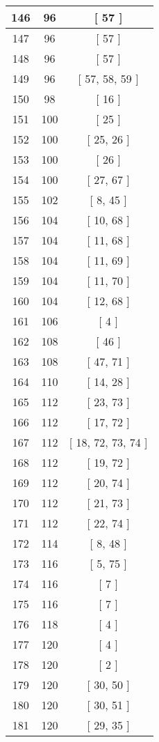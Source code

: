 \begin{center}
\begin{longtable}[H]{|| c c c ||}
\hline
146 & 96 & [ 57 ] \\ 
\hline
147 & 96 & [ 57 ] \\ 
\hline
148 & 96 & [ 57 ] \\ 
\hline
149 & 96 & [ 57, 58, 59 ] \\ 
\hline
150 & 98 & [ 16 ] \\ 
\hline
151 & 100 & [ 25 ] \\ 
\hline
152 & 100 & [ 25, 26 ] \\ 
\hline
153 & 100 & [ 26 ] \\ 
\hline
154 & 100 & [ 27, 67 ] \\ 
\hline
155 & 102 & [ 8, 45 ] \\ 
\hline
156 & 104 & [ 10, 68 ] \\ 
\hline
157 & 104 & [ 11, 68 ] \\ 
\hline
158 & 104 & [ 11, 69 ] \\ 
\hline
159 & 104 & [ 11, 70 ] \\ 
\hline
160 & 104 & [ 12, 68 ] \\ 
\hline
161 & 106 & [ 4 ] \\ 
\hline
162 & 108 & [ 46 ] \\ 
\hline
163 & 108 & [ 47, 71 ] \\ 
\hline
164 & 110 & [ 14, 28 ] \\ 
\hline
165 & 112 & [ 23, 73 ] \\ 
\hline
166 & 112 & [ 17, 72 ] \\ 
\hline
167 & 112 & [ 18, 72, 73, 74 ] \\ 
\hline
168 & 112 & [ 19, 72 ] \\ 
\hline
169 & 112 & [ 20, 74 ] \\ 
\hline
170 & 112 & [ 21, 73 ] \\ 
\hline
171 & 112 & [ 22, 74 ] \\ 
\hline
172 & 114 & [ 8, 48 ] \\ 
\hline
173 & 116 & [ 5, 75 ] \\ 
\hline
174 & 116 & [ 7 ] \\ 
\hline
175 & 116 & [ 7 ] \\ 
\hline
176 & 118 & [ 4 ] \\ 
\hline
177 & 120 & [ 4 ] \\ 
\hline
178 & 120 & [ 2 ] \\ 
\hline
179 & 120 & [ 30, 50 ] \\ 
\hline
180 & 120 & [ 30, 51 ] \\ 
\hline
181 & 120 & [ 29, 35 ] \\ 

\end{longtable}
\end{center}
